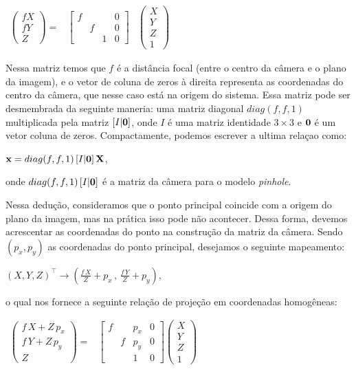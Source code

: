 \begin{center}
$
\begin{array}{ccc}
\begin{pmatrix}
fX\\
fY\\
Z
\end{pmatrix} = 
&
\begin{bmatrix}
f& & &0\\
 &f& &0\\
 & &1&0
\end{bmatrix}
&
\begin{pmatrix}
X\\
Y\\
Z\\
1
\end{pmatrix}
\end{array}
$
\end{center}

Nessa matriz temos que $f$ é a distância focal (entre o centro da câmera e o plano da imagem), e o vetor de coluna de zeros à direita representa as coordenadas do centro da câmera, que nesse caso está na origem do sistema. Essa matriz pode ser desmembrada da seguinte maneria: uma matriz diagonal $diag(f,f,1)$ multiplicada pela matriz $[I|{\bf 0}]$, onde $I$ é uma matriz identidade $3\times3$ e ${\bf 0}$ é um vetor coluna de zeros. Compactamente, podemos escrever a ultima relaçao como:

\begin{center}
$\mathbf{x} = diag(f,f,1)\,[I|{\bf 0}]\,\mathbf{X}$,
\end{center}
onde $diag(f,f,1)\,[I|{\bf 0}]$ é a matriz da câmera para o modelo \textit{pinhole}.

Nessa dedução, consideramos que o ponto principal  coincide com a origem do plano da imagem, mas na prática isso pode não acontecer. Dessa forma, devemos acrescentar as coordenadas do ponto na construção da matriz da câmera. Sendo $(p_x,p_y)$ as coordenadas do ponto principal, desejamos o seguinte mapeamento:

\begin{center}
$(X,Y,Z)^\top \rightarrow (\frac{f\,X}{Z}+p_x\,,\,\frac{f\,Y}{Z}+p_y)$,
\end{center}
o qual nos fornece a seguinte relação de projeção em coordenadas homogêneas:

\begin{center}
$
\begin{array}{ccc}
\begin{pmatrix}
f\,X + Z\,p_x\\
f\,Y + Z\,p_y\\
Z
\end{pmatrix}=
&
\begin{bmatrix}
f& &p_x&0\\
 &f&p_y&0\\
 & &1&0
\end{bmatrix}
\begin{pmatrix}
X\\
Y\\
Z\\
1
\end{pmatrix}
\end{array}
$
\end{center}

